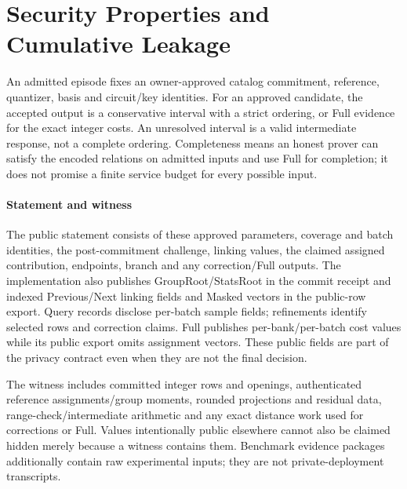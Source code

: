 \documentclass[5p,times,twocolumn]{elsarticle}
\begin{document}
\FloatBarrier
\section{Security Properties and Cumulative Leakage}
\label{app:security-leakage}
An admitted episode fixes an owner-approved catalog commitment, reference,
quantizer, basis and circuit/key identities. For an approved candidate,
the accepted output is a conservative interval with a strict ordering,
or Full evidence for the exact integer costs. An unresolved interval is
a valid intermediate response, not a complete ordering. Completeness
means an honest prover can satisfy the encoded relations on admitted
inputs and use Full for completion; it does not promise a finite service
budget for every possible input.

\paragraph{Statement and witness}
The public statement consists of these approved parameters, coverage and
batch identities, the post-commitment challenge, linking values, the
claimed assigned contribution, endpoints, branch and any correction/Full
outputs. The implementation also publishes GroupRoot/StatsRoot in the
commit receipt and indexed Previous/Next linking fields and Masked
vectors in the public-row export. Query records disclose per-batch
sample fields; refinements identify selected rows and correction claims.
Full publishes per-bank/per-batch cost values while its public export
omits assignment vectors. These public fields are part of the privacy
contract even when they are not the final decision.

The witness includes committed integer rows and openings, authenticated
reference assignments/group moments, rounded projections and residual
data, range-check/intermediate arithmetic and any exact distance work
used for corrections or Full. Values intentionally public elsewhere
cannot also be claimed hidden merely because a witness contains them.
Benchmark evidence packages additionally contain raw experimental inputs;
they are not private-deployment transcripts.
\end{document}
